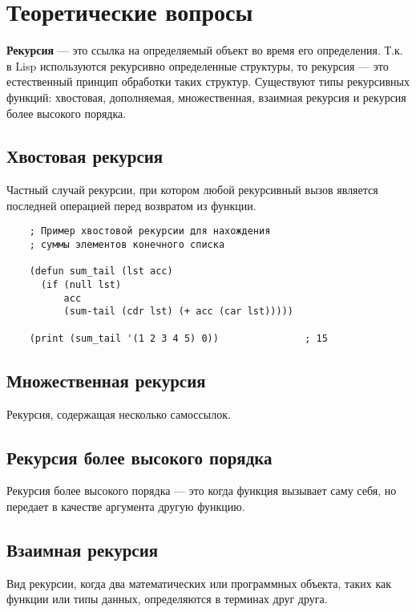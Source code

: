 \chapter{Теоретические вопросы}

\textbf{Рекурсия} --- это ссылка на определяемый объект во время его определения. Т.к. в Lisp используются рекурсивно определенные структуры, то рекурсия --- это естественный принцип обработки таких структур. Существуют типы рекурсивных функций: хвостовая,
дополняемая, множественная, взаимная рекурсия и рекурсия более высокого порядка.

\section{Хвостовая рекурсия}

Частный случай рекурсии, при котором любой рекурсивный вызов является последней операцией перед возвратом из функции.
    
\begin{lstlisting}
    ; Пример хвостовой рекурсии для нахождения 
    ; суммы элементов конечного списка
    
    (defun sum_tail (lst acc)
      (if (null lst)
          acc
          (sum-tail (cdr lst) (+ acc (car lst)))))
    
    (print (sum_tail '(1 2 3 4 5) 0))               ; 15 
\end{lstlisting}

\section{Множественная рекурсия}

Рекурсия, содержащая несколько самоссылок.

\section{Рекурсия более высокого порядка}

Рекурсия более высокого порядка --- это когда функция вызывает саму себя, но передает в качестве аргумента другую функцию.

\section{Взаимная рекурсия}

Вид рекурсии, когда два математических или программных объекта, таких как функции или типы данных, определяются в терминах друг друга.

